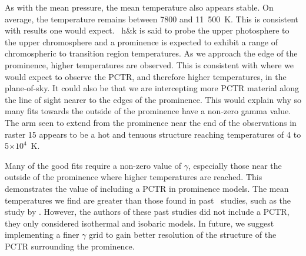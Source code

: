 As with the mean pressure, the mean temperature also appears stable. On average, the temperature remains between 7800 and 11~500~K. This is consistent with results one would expect. \mgii~h\&k is said to probe the upper photosphere to the upper chromosphere \citep{depontieu_interface_2014} and a prominence is expected to exhibit a range of chromospheric to transition region temperatures. As we approach the edge of the prominence, higher temperatures are observed. This is consistent with where we would expect to observe the PCTR, and therefore higher temperatures, in the plane-of-sky. It could also be that we are intercepting more PCTR material along the line of sight nearer to the edges of the prominence. This would explain why so many fits towards the outside of the prominence have a non-zero gamma value. The arm seen to extend from the prominence near the end of the observations in raster 15 appears to be a hot and tenuous structure reaching temperatures of 4 to 5$\times10^4$~K.

Many of the good fits require a non-zero value of $\gamma$, especially those near the outside of the prominence where higher temperatures are reached. This demonstrates the value of including a PCTR in prominence models. The mean temperatures we find are greater than those found in past \mgii\ studies, such as the study by \citep{zhang_launch_2019}. However, the authors of these past studies did not include a PCTR, they only considered isothermal and isobaric models. In future, we suggest implementing a finer $\gamma$ grid to gain better resolution of the structure of the PCTR surrounding the prominence.

